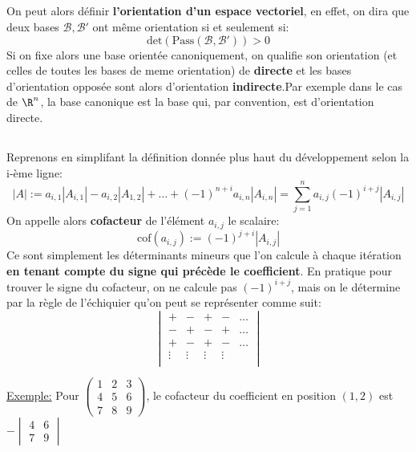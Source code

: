 \subsection*{}
On peut alors définir \textbf{l'orientation d'un espace vectoriel}, en effet, on dira que deux bases \(\mathscr{B}, \mathscr{B'}\) ont même orientation si et seulement si:
\[
   \text{det}(\text{Pass}(\mathscr{B}, \mathscr{B'})) > 0
\]
Si on fixe alors une base orientée canoniquement, on qualifie son orientation (et celles de toutes les bases de meme orientation) de \textbf{directe} et les bases d'orientation opposée sont alors d'orientation \textbf{indirecte}.Par exemple dans le cas de \(\R^n\), la base canonique est la base qui, par convention, est d'orientation directe.
\subsection*{}

Reprenons en simplifant la définition donnée plus haut du développement selon la i-ème ligne:
\[
   |A| := a_{i, 1}|A_{i, 1}| - a_{i, 2}|A_{1, 2}| + \ldots + (-1)^{n+i}a_{i, n}|A_{i, n}| = \sum_{j=1}^{n}a_{i, j}(-1)^{i+j}|A_{i, j}|
\]
On appelle alors \textbf{cofacteur} de l'élément \(a_{i, j}\) le scalaire:
\[ 
   \text{cof}(a_{i, j}) := (-1)^{j+i}|A_{i, j}|
\]
Ce sont simplement les déterminants mineurs que l'on calcule à chaque itération \textbf{en tenant compte du signe qui précède le coefficient}. En pratique pour trouver le signe du cofacteur, on ne calcule pas \((-1)^{i + j}\), mais on le détermine par la règle de l'échiquier qu'on peut se représenter comme suit:
\[
   \begin{vmatrix} + & - & + & - & \ldots \\ - & + & - & + &\ldots \\ + & - & + & - &\ldots \\ \vdots & \vdots & \vdots & \vdots \\\end{vmatrix}
\]

\underline{Exemple:} Pour \(\begin{pmatrix}
   1 & 2 & 3 \\ 4 & 5 & 6 \\ 7 & 8 & 9
\end{pmatrix}\), le cofacteur du coefficient en position \((1, 2)\) est 
\(- \begin{vmatrix} 4 & 6 \\ 7 & 9\end{vmatrix} \)
\pagebreak
